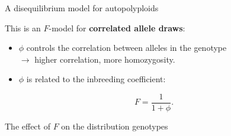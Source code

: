 \documentclass[presentation,sansserif,12pt]{beamer}
\begin{document}
  \begin{frame}[t]{A disequilibrium model for autopolyploids}
  
  This is an $F$-model for \textbf{correlated allele draws}:
  \vspace{0.3in}
  \pause
  
  \begin{itemize}
  \item $\phi$ controls the correlation between alleles in the genotype \pause \\[0.05in]\hspace{5pt}$\rightarrow$ higher correlation, more homozygosity.
  \vspace{0.3in}
  \pause
  
   \item $\phi$ is related to the inbreeding coefficient:
   \end{itemize}
   
   \begin{equation*}
   F = \frac{1}{1+\phi}.
   \end{equation*}
   
  

 
\end{frame}

{  
\begin{frame}[c,plain]{The effect of $F$ on the distribution genotypes}
\pause

  \begin{center}
  \end{center}
  
\end{frame}

}
\end{document}
